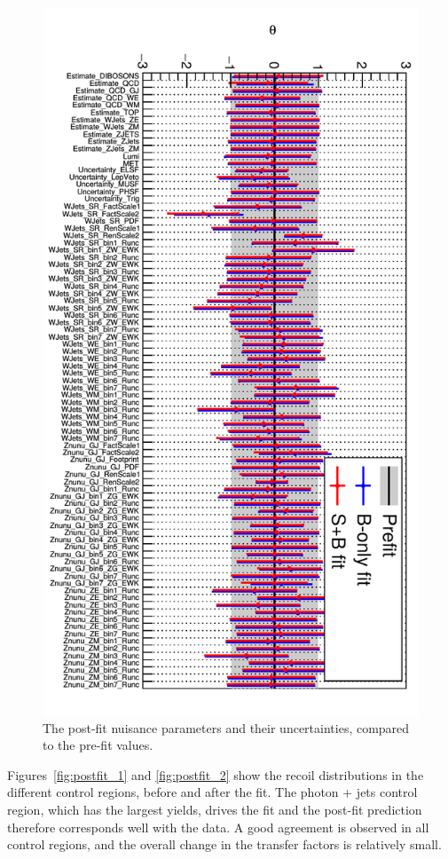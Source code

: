 \begin{figure}[p]
  \centering
 \includegraphics[width=.8\textwidth]{nuisance.png} 
 \caption{The post-fit nuisance parameters and their uncertainties, compared to the pre-fit values.}
 \label{fig:nuisance}
\end{figure}

Figures~\ref{fig:postfit_1} and \ref{fig:postfit_2} show the recoil distributions in the different control regions, before and after the fit. The photon + jets control region, which has the largest yields, drives the fit and the post-fit prediction therefore corresponds well with the data. A good agreement is observed in all control regions, and the overall change in the transfer factors is relatively small.

